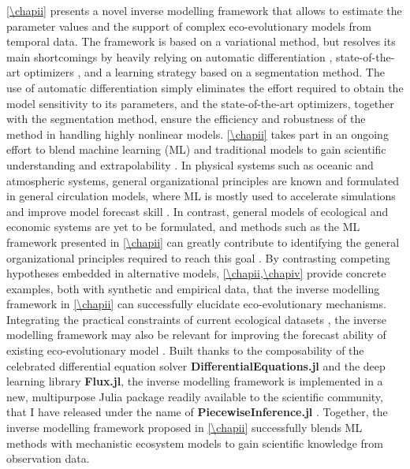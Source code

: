 %
\cref{\chapii} presents a novel inverse modelling framework that allows to estimate the parameter values and the support of complex eco-evolutionary models from temporal data.
% 
The framework is based on a variational method, but resolves its main shortcomings by heavily relying on automatic differentiation \citep{Rackauckas2020a}, state-of-the-art optimizers \citep{Kingma2014}, and a learning strategy based on a segmentation method. 
% 
The use of automatic differentiation simply eliminates the effort required to obtain the model sensitivity to its parameters, and the state-of-the-art optimizers, together with the segmentation method, ensure the efficiency and robustness of the method in handling highly nonlinear models.
% 
\cref{\chapii} takes part in an ongoing effort to blend machine learning (ML) and traditional models to gain scientific understanding and extrapolability \citep{Karpatne2017,Rackauckas2020a,Schneider2017,Rolnick2023,Kashinath2021,Yazdani2020,Raissi2019}. 
% 
In physical systems such as oceanic and atmospheric systems, general organizational principles are known and formulated in general circulation models, where ML is mostly used to accelerate simulations \citep{Kashinath2021} and improve model forecast skill \citep{Schneider2017}. In contrast, general models of ecological and economic systems are yet to be formulated, and methods such as the ML framework presented in \cref{\chapii} can greatly contribute to identifying the general organizational principles required to reach this goal \citep{Karpatne2017}. 
% 
By contrasting competing hypotheses embedded in alternative models, \cref{\chapii,\chapiv} provide concrete examples, both with synthetic and empirical data, that the inverse modelling framework in \cref{\chapii} can successfully elucidate eco-evolutionary mechanisms.
Integrating the practical constraints of current ecological datasets \citep{Dornelas2018}, the inverse modelling framework may also be relevant for improving the forecast ability of existing eco-evolutionary model \citep{Norberg2012}.
% 
Built thanks to the composability of the celebrated differential equation solver \textbf{DifferentialEquations.jl} and the deep learning library \textbf{Flux.jl}, the inverse modelling framework is implemented in a new, multipurpose Julia package readily available to the scientific community, that I have released under the name of \textbf{PiecewiseInference.jl} \citep{PiecewiseInference}.
% 
Together, the inverse modelling framework proposed in \cref{\chapii} successfully blends ML methods with mechanistic ecosystem models to gain scientific knowledge from observation data. 

